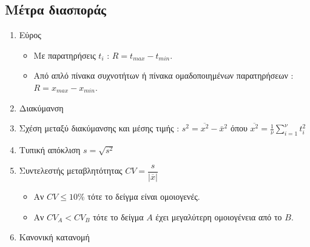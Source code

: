 \documentclass[a4paper,11pt,twoside]{article}
\begin{document}
\subsection{Μέτρα διασποράς}
\begin{enumerate}[resume]
\item\label{evros} Εύρος
\begin{itemize}
\item Με παρατηρήσεις $t_i$ : $ R=t_{max}-t_{min} $.
\item Από απλό πίνακα συχνοτήτων ή πίνακα ομαδοποιημένων παρατηρήσεων : $ R=x_{max}-x_{min} $.
\end{itemize}
\item Διακύμανση\label{diakymansh}
\item Σχέση μεταξύ διακύμανσης και μέσης τιμής : $s^2=\overline{x^2}-\bar{x}^2$ όπου $\overline{x^2}=\frac{1}{\nu}\displaystyle\sum\limits_{i=1}^{\nu}{t_i^2}$
\item Τυπική απόκλιση $ s=\sqrt{s^2} $
\item Συντελεστής μεταβλητότητας $ CV=\dfrac{s}{|\overline{x}|} $
\begin{itemize}
\item Αν $CV\leq 10\%$ τότε το δείγμα είναι ομοιογενές.
\item Αν $CV_A<CV_B$ τότε το δείγμα $A$ έχει μεγαλύτερη ομοιογένεια από το $B$.
\end{itemize}
\item Κανονική κατανομή
\begin{center}

\end{center}
\end{enumerate}
\end{document}
